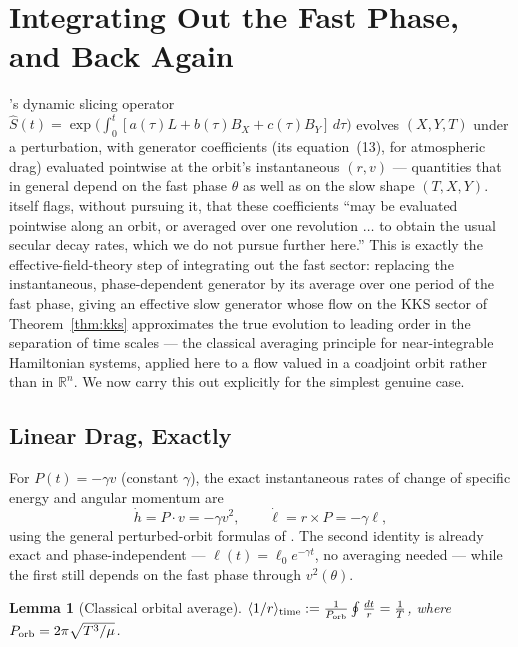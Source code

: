 \documentclass[11pt]{amsart}
\newtheorem{lemma}[theorem]{Lemma}
\theoremstyle{remark}
\begin{document}
\section{Integrating Out the Fast Phase, and Back Again}

\cite{Ebert2026Cone}'s dynamic slicing operator $\hat S(t)=\exp\big(\int_0^t[a(\tau)L+b(\tau)B_X+c(\tau)B_Y]\,d\tau\big)$ evolves $(X,Y,T)$ under a perturbation, with generator coefficients (its equation~(13), for atmospheric drag) evaluated pointwise at the orbit's instantaneous $(r,v)$ --- quantities that in general depend on the fast phase $\theta$ as well as on the slow shape $(T,X,Y)$. \cite{Ebert2026Cone} itself flags, without pursuing it, that these coefficients ``may be evaluated pointwise along an orbit, or averaged over one revolution $\ldots$ to obtain the usual secular decay rates, which we do not pursue further here.'' This is exactly the effective-field-theory step of integrating out the fast sector: replacing the instantaneous, phase-dependent generator by its average over one period of the fast phase, giving an effective slow generator whose flow on the KKS sector of Theorem~\ref{thm:kks} approximates the true evolution to leading order in the separation of time scales --- the classical averaging principle for near-integrable Hamiltonian systems, applied here to a flow valued in a coadjoint orbit rather than in $\mathbb R^n$. We now carry this out explicitly for the simplest genuine case.

\subsection{Linear Drag, Exactly}

For $P(t)=-\gamma v$ (constant $\gamma$), the exact instantaneous rates of change of specific energy and angular momentum are
\begin{equation}
\dot h = P\cdot v = -\gamma v^2, \qquad \dot\ell = r\times P = -\gamma\ell, \tag{5.1}
\end{equation}
using the general perturbed-orbit formulas of \cite{Ebert2026LeviCivita}. The second identity is already exact and phase-independent --- $\ell(t)=\ell_0e^{-\gamma t}$, no averaging needed --- while the first still depends on the fast phase through $v^2(\theta)$.

\begin{lemma}[Classical orbital average]\label{lem:avg}
$\langle1/r\rangle_{\rm time}:=\frac1{P_{\rm orb}}\oint\frac{dt}{r}=\frac1T$, where $P_{\rm orb}=2\pi\sqrt{T^3/\mu}$.
\end{lemma}
\end{document}
